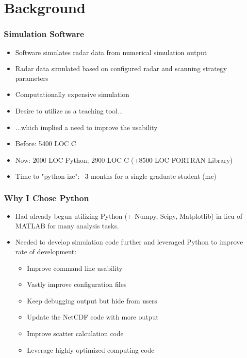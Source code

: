 \documentclass[red, hyperref={pdfpagelabels=false}]{beamer}
\begin{document}
\section{Background}
\begin{frame}[<+->]
  \frametitle{Simulation Software}
  \begin{itemize}
    \item Software simulates radar data from numerical simulation output
    \item Radar data simulated based on configured radar and scanning strategy parameters
    \item Computationally expensive simulation
    \item Desire to utilize as a teaching tool...
    \item ...which implied a need to improve the usability
    \item Before: 5400 LOC C
    \item Now: 2000 LOC Python, 2900 LOC C (+8500 LOC FORTRAN Library)
    \item Time to "python-ize": ~3 months for a single graduate student (me)
  \end{itemize}
\end{frame}

\begin{frame}[<+->]
  \frametitle{Why I Chose Python}
  \begin{itemize}
    \item Had already begun utilizing Python (+ Numpy, Scipy, Matplotlib) in lieu of MATLAB
        for many analysis tasks.
    \item Needed to develop simulation code further and leveraged Python to improve rate of development:
    \begin{itemize}
      \item<3-> Improve command line usability 
      \item<3-> Vastly improve configuration files 
      \item<3-> Keep debugging output but hide from users 
      \item<3-> Update the NetCDF code with more output 
      \item<3-> Improve scatter calculation code 
      \item<3-> Leverage highly optimized computing code 
    \end{itemize}
  \end{itemize}
\end{frame}
\end{document}
